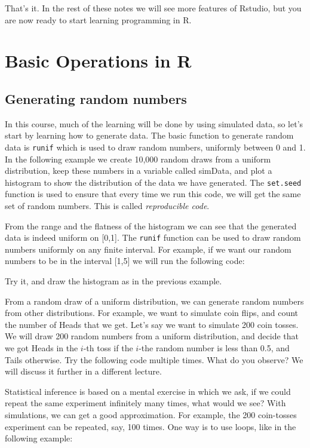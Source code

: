 That's it. In the rest of these notes we will see more features of Rstudio, but you are now ready to start learning programming in R.


\section{Basic Operations in R}
\subsection{Generating random numbers}
In this course, much of the learning will be done by using simulated data, so let's start by learning how to generate data. The basic function to generate random data is \texttt{runif} which is used to draw random numbers, uniformly between 0 and 1. In the following example we create 10,000 random draws from a uniform distribution, keep these numbers in a variable called simData, and plot a histogram to show the distribution of the data we have generated. The \texttt{set.seed} function is used to ensure that every time we run this code, we will get the same set of random numbers. This is called \textit{reproducible code}. 


From the range and the flatness of the histogram we can see that the generated data is indeed uniform on [0,1]. The \texttt{runif} function can be used to draw random numbers uniformly on any finite interval. For example, if we want our random numbers to be in the interval [1,5] we will run the following code:

Try it, and draw the histogram as in the previous example.

From a random draw of a uniform distribution, we can generate random numbers from other distributions. For example, we want to simulate coin flips, and count the number of Heads that we get. Let's say we want to simulate 200 coin tosses. We will draw 200 random numbers from a uniform distribution, and decide that we got Heads in the $i$-th toss if the $i$-the random number is less than 0.5, and Tails otherwise.
Try the following code multiple times. What do you observe? We will discuss it further in a different lecture.



Statistical inference is based on a mental exercise in which we ask, if we could repeat the same experiment infinitely many times, what would we see? With simulations, we can get a good approximation. For example, the 200 coin-tosses experiment can be repeated, say, 100 times. One way is to use loops, like in the following example:


